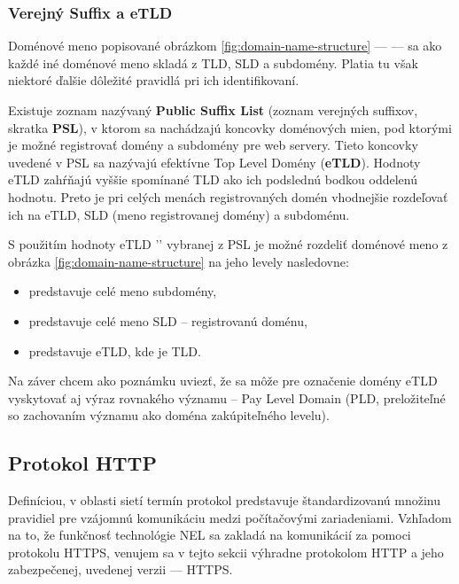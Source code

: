 \subsubsection{Verejný Suffix a eTLD}

Doménové meno popisované obrázkom \ref{fig:domain-name-structure} ---  --- sa ako každé iné doménové meno skladá z TLD, SLD a subdomény. 
Platia tu však niektoré ďalšie dôležité pravidlá pri ich identifikovaní.

Existuje zoznam nazývaný \textbf{Public Suffix List} (zoznam verejných suffixov, skratka \textbf{PSL}), v ktorom sa nachádzajú koncovky doménových mien, pod ktorými je možné registrovať domény a subdomény pre web servery.
Tieto koncovky uvedené v PSL sa nazývajú efektívne Top Level Domény (\textbf{eTLD}).
Hodnoty eTLD zahŕňajú vyššie spomínané TLD ako ich podslednú bodkou oddelenú hodnotu.
Preto je pri celých menách registrovaných domén vhodnejšie rozdeľovať ich na eTLD, SLD (meno registrovanej domény) a subdoménu.

S použitím hodnoty eTLD '' vybranej z PSL je možné rozdeliť doménové meno z obrázka \ref{fig:domain-name-structure} na jeho levely nasledovne: 
\begin{itemize}
    \item {} predstavuje celé meno subdomény,
    \item {} predstavuje celé meno SLD -- registrovanú doménu,
    \item {} predstavuje eTLD, kde  je TLD.
\end{itemize}


Na záver chcem ako poznámku uviezť, že sa môže pre označenie domény eTLD vyskytovať aj výraz rovnakého významu -- Pay Level Domain (PLD, preložiteľné so zachovaním významu ako doména zakúpiteľného levelu).

\subsection{Protokol HTTP}
\label{protokol-http}
Definíciou, v oblasti sietí termín protokol predstavuje štandardizovanú množinu pravidiel pre vzájomnú komunikáciu medzi počítačovými zariadeniami. %
Vzhľadom na to, že funkčnosť technológie NEL sa zakladá na komunikácií za pomoci protokolu HTTPS, %
venujem sa v tejto sekcii výhradne protokolom HTTP a jeho zabezpečenej, uvedenej verzii --- HTTPS. 

